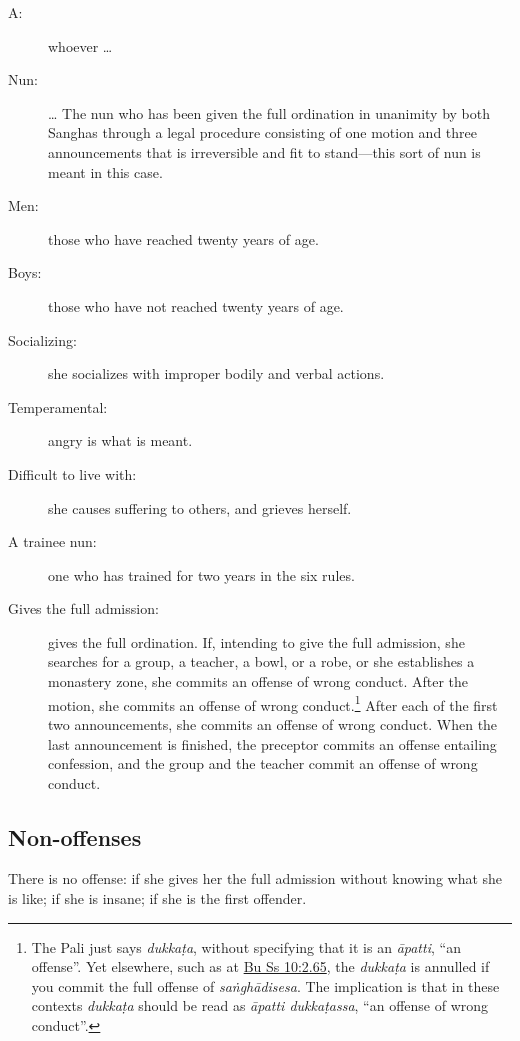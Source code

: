 \documentclass[12pt,openany]{book}%
\begin{document}
\begin{description}%
\item[A: ] whoever … %
\item[Nun: ] … The nun who has been given the full ordination in unanimity by both Sanghas through a legal procedure consisting of one motion and three announcements that is irreversible and fit to stand—this sort of nun is meant in this case. %
\item[Men: ] those who have reached twenty years of age. %
\item[Boys: ] those who have not reached twenty years of age. %
\item[Socializing: ] she socializes with improper bodily and verbal actions. %
\item[Temperamental: ] angry is what is meant. %
\item[Difficult to live with: ] she causes suffering to others, and grieves herself. %
\item[A trainee nun: ] one who has trained for two years in the six rules. %
\item[Gives the full admission: ] gives the full ordination. If, intending to give the full admission, she searches for a group, a teacher, a bowl, or a robe, or she establishes a monastery zone, she commits an offense of wrong conduct. After the motion, she commits an offense of wrong conduct.\footnote{The Pali just says \textit{\textsanskrit{dukkaṭa}}, without specifying that it is an \textit{\textsanskrit{āpatti}}, “an offense”. Yet elsewhere, such as at \href{https://suttacentral.net/pli-tv-bu-vb-ss10/en/brahmali\#2.65}{Bu Ss 10:2.65}, the \textit{\textsanskrit{dukkaṭa}} is annulled if you commit the full offense of \textit{\textsanskrit{saṅghādisesa}}. The implication is that in these contexts \textit{\textsanskrit{dukkaṭa}} should be read as \textit{\textsanskrit{āpatti} \textsanskrit{dukkaṭassa}}, “an offense of wrong conduct”. } After each of the first two announcements, she commits an offense of wrong conduct. When the last announcement is finished, the preceptor commits an offense entailing confession, and the group and the teacher commit an offense of wrong conduct. %
\end{description}

\subsection*{Non-offenses }

There is no offense: if she gives her the full admission without knowing what she is like;  if she is insane;  if she is the first offender. 
\end{document}
